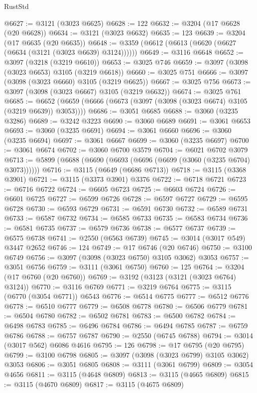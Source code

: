 \begin{lexlean}{RustStd}
\begin{coremodule}
{\begin{coremodule}
{{{{{{{{{{{{{{{{{{{{{{{{{{{{{{{{@6627 := @3121 (@3023 @6625)
@6628 := 122
@6632 := @3204 (@17 @6628 (@20 @6628))
@6634 := @3121 (@3023 @6632)
@6635 := 123
@6639 := @3204 (@17 @6635 (@20 @6635))
@6648 := @3359 (@6612 (@6613 (@6620 (@6627 (@6634 (@3121 (@3023 @6639) @3124))))))
@6649 := @3116 @6648
@6652 := @3097 (@3218 (@3219 @6610))
@6653 := @3025 @746
@6659 := @3097 (@3098 (@3023 @6653) @3105 (@3219 @6618))
@6660 := @3025 @751
@6666 := @3097 (@3098 (@3023 @6660) @3105 (@3219 @6625))
@6667 := @3025 @756
@6673 := @3097 (@3098 (@3023 @6667) @3105 (@3219 @6632))
@6674 := @3025 @761
@6685 := @6652 (@6659 (@6666 (@6673 (@3097 (@3098 (@3023 @6674) @3105 (@3219 @6639)) @3053))))
@6686 := @3051 @6685
@6688 := @3060 (@3235 @3286)
@6689 := @3242 @3223
@6690 := @3060 @6689
@6691 := @3061 @6653
@6693 := @3060 (@3235 @6691)
@6694 := @3061 @6660
@6696 := @3060 (@3235 @6694)
@6697 := @3061 @6667
@6699 := @3060 (@3235 @6697)
@6700 := @3061 @6674
@6702 := @3060 @6700 @3579
@6704 := @6021 @6702 @3079
@6713 := @5899 (@6688 (@6690 (@6693 (@6696 (@6699 (@3060 (@3235 @6704) @3073))))))
@6716 := @3115 (@6649 (@6686 @6713))
@6718 := @3115 (@3368 @3901)
@6721 := @3115 (@3373 @3901) @3376
@6722 := @6718 @6721
@6723 := @6716 @6722
@6724 := @6605 @6723
@6725 := @6603 @6724
@6726 := @6601 @6725
@6727 := @6599 @6726
@6728 := @6597 @6727
@6729 := @6595 @6728
@6730 := @6593 @6729
@6731 := @6591 @6730
@6732 := @6589 @6731
@6733 := @6587 @6732
@6734 := @6585 @6733
@6735 := @6583 @6734
@6736 := @6581 @6735
@6737 := @6579 @6736
@6738 := @6577 @6737
@6739 := @6575 @6738
@6741 := @2550 (@6563 @6739)
@6745 := @3014 (@3017 @549) @3447 @2652
@6746 := 124
@6749 := @17 @6746 (@20 @6746)
@6750 := @3100 @6749
@6756 := @3097 (@3098 (@3023 @6750) @3105 @3062) @3053
@6757 := @3051 @6756
@6759 := @3111 (@3061 @6750)
@6760 := 125
@6764 := @3204 (@17 @6760 (@20 @6760))
@6769 := @3192 (@3123 (@3121 (@3023 @6764) @3124))
@6770 := @3116 @6769
@6771 := @3219 @6764
@6775 := @3115 (@6770 (@3054 @6771)) @6543
@6776 := @6514 @6775
@6777 := @6512 @6776
@6778 := @6510 @6777
@6779 := @6508 @6778
@6780 := @6506 @6779
@6781 := @6504 @6780
@6782 := @6502 @6781
@6783 := @6500 @6782
@6784 := @6498 @6783
@6785 := @6496 @6784
@6786 := @6494 @6785
@6787 := @6759 @6786
@6788 := @6757 @6787
@6790 := @2550 (@6745 @6788)
@6794 := @3014 (@3017 @562) @6086 @4616
@6795 := 126
@6798 := @17 @6795 (@20 @6795)
@6799 := @3100 @6798
@6805 := @3097 (@3098 (@3023 @6799) @3105 @3062) @3053
@6806 := @3051 @6805
@6808 := @3111 (@3061 @6799)
@6809 := @3054 @4656
@6811 := @3115 (@4648 @6809)
@6813 := @3115 (@4665 @6809)
@6815 := @3115 (@4670 @6809)
@6817 := @3115 (@4675 @6809)
}}}}}}}}}}}}}}}}}}}}}}}}}}}}}}}}
\end{coremodule}}
\end{coremodule}
\end{lexlean}
